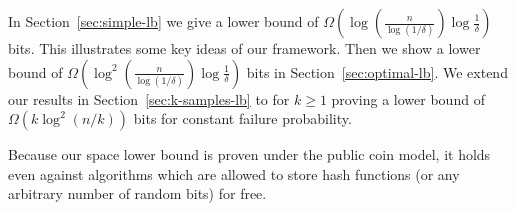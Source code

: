 
In Section~\ref{sec:simple-lb} we give a lower bound of $\Omega(\log(\frac n{\log(1/\delta)}) \log \frac{1}{\delta})$ bits. This illustrates some key ideas of our framework. Then we show a lower bound of $\Omega(\log^2(\frac n{\log(1/\delta)}) \log \frac{1}{\delta})$ bits in Section~\ref{sec:optimal-lb}.
We extend our results in Section~\ref{sec:k-samples-lb} to  for $k\ge 1$ proving a lower bound of $\Omega(k\log^2(n/k))$ bits for constant failure probability.

\begin{remark}
\textup{
  Because our space lower bound is proven under the public coin model, it holds even against algorithms which are allowed to store hash functions (or any arbitrary number of random bits) for free.
}
\end{remark}